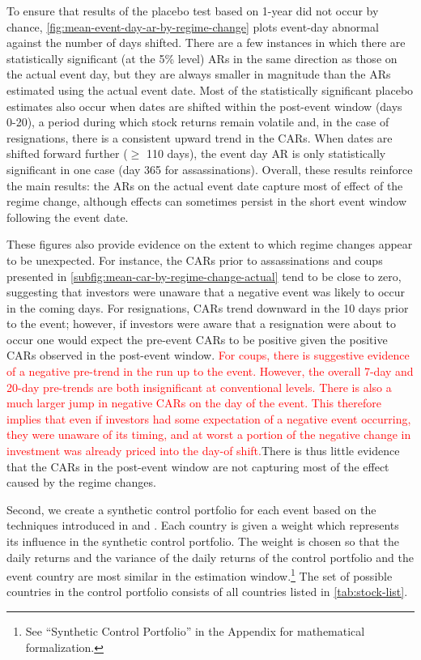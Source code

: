 \documentclass[12pt,final,fleqn]{article}
\theoremstyle{plain}
\begin{document}
To ensure that results of the placebo test based on 1-year did not occur by chance, \autoref{fig:mean-event-day-ar-by-regime-change} plots event-day abnormal against the number of days shifted. There are a few instances in which there are statistically significant (at the 5\% level) ARs in the same direction as those on the actual event day, but they are always smaller in magnitude than the ARs estimated using the actual event date. Most of the statistically significant placebo estimates also occur when dates are shifted within the post-event window (days 0-20), a period during which stock returns remain volatile and, in the case of resignations, there is a consistent upward trend in the CARs. When dates are shifted forward further ($\geq$ 110 days), the event day AR is only statistically significant in one case (day 365 for assassinations). Overall, these results reinforce the main results: the ARs on the actual event date capture most of effect of the regime change, although effects can sometimes persist in the short event window following the event date. 

These figures also provide evidence on the extent to which regime changes appear to be unexpected. For instance, the CARs prior to assassinations and coups presented in \autoref{subfig:mean-car-by-regime-change-actual} tend to be close to zero, suggesting that investors were unaware that a negative event was likely to occur in the coming days. For resignations, CARs trend downward in the 10 days prior to the event; however, if investors were aware that a resignation were about to occur one would expect the pre-event CARs to be positive given the positive CARs observed in the post-event window. \textcolor{red}{For coups, there is suggestive evidence of a negative pre-trend in the run up to the event. However, the overall 7-day and 20-day pre-trends are both insignificant at conventional levels. There is also a much larger jump in negative CARs on the day of the event. This therefore implies that even if investors had some expectation of a negative event occurring, they were unaware of its timing, and at worst a portion of the negative change in investment was already priced into the day-of shift.}There is thus little evidence that the CARs in the post-event window are not capturing most of the effect caused by the regime changes.

Second, we create a synthetic control portfolio for each event based on the techniques introduced in \citet{abadie2003economic} and \citet{abadie2010synthetic}. Each country is given a weight which represents its influence in the synthetic control portfolio. The weight is chosen so that the daily returns and the variance of the daily returns of the control portfolio and the event country are most similar in the estimation window.\footnote{See ``Synthetic Control Portfolio'' in the Appendix for mathematical formalization.} The set of possible countries in the control portfolio consists of all countries listed in \autoref{tab:stock-list}.
\end{document}
